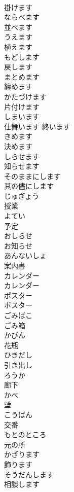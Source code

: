 \documentclass[8pt]{extreport}
\begin{document}
\begin{CJK}{UTF8}{min}
\\	掛けます	
\\	ならべます	
\\	並べます	
\\	うえます	
\\	植えます	
\\	もどします	
\\	戻します	
\\	まとめます	
\\	纏めます	
\\	かたづけます	
\\	片付けます	
\\	しまいます	
\\	仕舞います 終います	
\\	きめます	
\\	決めます	
\\	しらせます	
\\	知らせます	
\\	そのままにします	
\\	其の儘にします	
\\	じゅぎょう	
\\	授業	
\\	よてい	
\\	予定	
\\	おしらせ	
\\	お知らせ	
\\	あんないしょ	
\\	案内書	
\\	カレンダー	
\\	カレンダー	
\\	ポスター	
\\	ポスター	
\\	ごみばこ	
\\	ごみ箱	
\\	かびん	
\\	花瓶	
\\	ひきだし	
\\	引き出し	
\\	ろうか	
\\	廊下	
\\	かべ	
\\	壁	
\\	こうばん	
\\	交番	
\\	もとのところ	
\\	元の所	
\\	かざります	
\\	飾ります		
\\	そうだんします	
\\	相談します		

\end{CJK}
\end{document}
